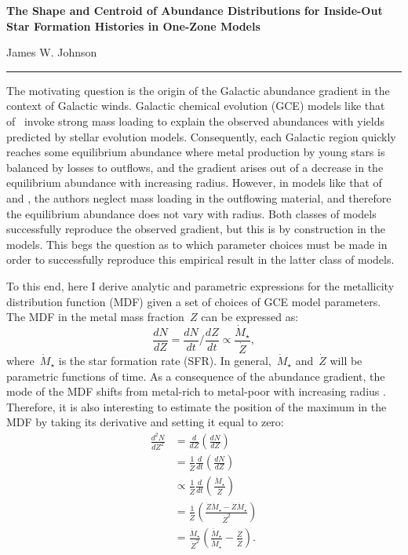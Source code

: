\documentclass[12pt]{article}
\begin{document}
\begin{center}
\textbf{The Shape and Centroid of Abundance Distributions for Inside-Out Star
Formation Histories in One-Zone Models}
\par\null\par
James W. Johnson
\par\null\par
\rule[0.7\baselineskip]{0.5\textwidth}{0.4pt}
\end{center}

\par\noindent
The motivating question is the origin of the Galactic abundance gradient in the
context of Galactic winds.
Galactic chemical evolution (GCE) models like that of~\citet{Johnson2021}
invoke strong mass loading to explain the observed abundances with yields
predicted by stellar evolution models.
Consequently, each Galactic region quickly reaches some equilibrium abundance
where metal production by young stars is balanced by losses to outflows, and
the gradient arises out of a decrease in the equilibrium abundance with
increasing radius.
However, in models like that of~\citet*{Minchev2013, Minchev2014} and
\citet{Spitoni2019}, the authors neglect mass loading in the outflowing
material, and therefore the equilibrium abundance does not vary with radius.
Both classes of models successfully reproduce the observed gradient, but this
is by construction in the~\citet{Johnson2021} models.
This begs the question as to which parameter choices must be made in order to
successfully reproduce this empirical result in the latter class of models.
\par
To this end, here I derive analytic and parametric expressions for the
metallicity distribution function (MDF) given a set of choices of GCE model
parameters.
The MDF in the metal mass fraction~$Z$ can be expressed as:
\begin{equation}
\frac{dN}{dZ} = \frac{dN}{dt} \bigg/ \frac{dZ}{dt}
\propto \frac{\dot{M}_\star}{\dot{Z}},
\label{eq:dndz}
\end{equation}
where~$\dot{M}_\star$ is the star formation rate (SFR).
In general,~$\dot{M}_\star$ and~$\dot{Z}$ will be parametric functions of time.
As a consequence of the abundance gradient, the mode of the MDF shifts from
metal-rich to metal-poor with increasing radius
\citep[see, e.g.,][]{Hayden2015}.
Therefore, it is also interesting to estimate the position of the maximum in
the MDF by taking its derivative and setting it equal to zero:
\begin{subequations}\begin{align}
\frac{d^2N}{dZ^2} &= \frac{d}{dZ} \left(\frac{dN}{dZ}\right)
\\
&= \frac{1}{\dot{Z}} \frac{d}{dt} \left(\frac{dN}{dZ}\right)
\\
&\propto \frac{1}{\dot{Z}} \frac{d}{dt}
\left(\frac{\dot{M}_\star}{\dot{Z}}\right)
\\
&= \frac{1}{\dot{Z}} \left(\frac{
	\dot{Z}\ddot{M}_\star - \ddot{Z}\dot{M}_\star
}{
	\dot{Z}^2
}\right)
\\
&= \frac{\dot{M}_\star}{\dot{Z}^2}
\left(\frac{\ddot{M}_\star}{\dot{M}_\star} - \frac{\ddot{Z}}{\dot{Z}}\right).
\label{eq:d2ndz2}
\end{align}\end{subequations}
\end{document}

